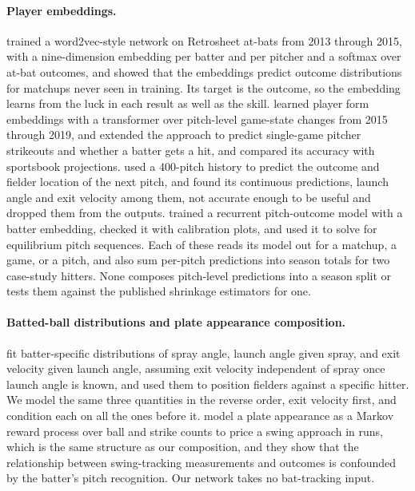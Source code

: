 \documentclass[11pt,letterpaper]{article}
\begin{document}
\paragraph{Player embeddings.} \citet{alcorn2018} trained a word2vec-style network on Retrosheet at-bats from 2013 through 2015, with a nine-dimension embedding per batter and per pitcher and a softmax over at-bat outcomes, and showed that the embeddings predict outcome distributions for matchups never seen in training. Its target is the outcome, so the embedding learns from the luck in each result as well as the skill. \citet{heaton2022} learned player form embeddings with a transformer over pitch-level game-state changes from 2015 through 2019, and \citet{heaton2023} extended the approach to predict single-game pitcher strikeouts and whether a batter gets a hit, and compared its accuracy with sportsbook projections. \citet{transformer2025} used a 400-pitch history to predict the outcome and fielder location of the next pitch, and found its continuous predictions, launch angle and exit velocity among them, not accurate enough to be useful and dropped them from the outputs. \citet{melville2023} trained a recurrent pitch-outcome model with a batter embedding, checked it with calibration plots, and used it to solve for equilibrium pitch sequences. Each of these reads its model out for a matchup, a game, or a pitch, and \citet{transformer2025} also sum per-pitch predictions into season totals for two case-study hitters. None composes pitch-level predictions into a season split or tests them against the published shrinkage estimators for one.

\paragraph{Batted-ball distributions and plate appearance composition.} \citet{melville2024} fit batter-specific distributions of spray angle, launch angle given spray, and exit velocity given launch angle, assuming exit velocity independent of spray once launch angle is known, and used them to position fielders against a specific hitter. We model the same three quantities in the reverse order, exit velocity first, and condition each on all the ones before it. \citet{powers2025} model a plate appearance as a Markov reward process over ball and strike counts to price a swing approach in runs, which is the same structure as our composition, and they show that the relationship between swing-tracking measurements and outcomes is confounded by the batter's pitch recognition. Our network takes no bat-tracking input.
\end{document}
